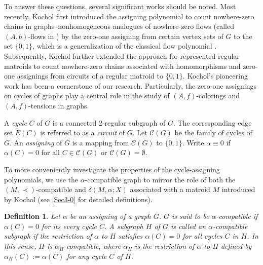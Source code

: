 \documentclass[12pt]{article}%
\numberwithin{equation}{section}
\newtheorem{definition}[definition]{Definition}
\begin{document}
To answer these questions, several significant works should be noted. Most recently, Kochol \cite{Kochol2022} first introduced the assigning polynomial to count nowhere-zero chains in graphs--nonhomogeneous analogues of nowhere-zero flows (called $(A,b)$-flows in \cite{Lai2006}) by the zero-one assigning from certain vertex sets of $G$ to the set $\{0,1\}$, which is a generalization of the classical flow polynomial \cite{Tutte1954}. Subsequently, Kochol \cite{Kochol2024} further extended the approach for represented regular matroids to count nowhere-zero chains associated with homomorphisms and zero-one assignings from circuits of a regular matroid to $\{0,1\}$. Kochol's pioneering work has been a cornerstone of our research. Particularly, the zero-one assignings on cycles of graphs play a central  role in the study of $(A,f)$-colorings and $(A,f)$-tensions in graphs. 

A {\em cycle } $C$ of $G$ is a connected 2-regular subgraph of $G$. The corresponding edge set $E(C)$ is referred to as a {\em circuit} of $G$. Let $\mathcal{C}(G)$ be the family of cycles of $G$. An {\em assigning} of $G$ is a mapping from $\mathcal{C}(G)$ to $\{0,1\}$. Write $\alpha\equiv0$ if $\alpha(C)=0$ for all $C\in\mathcal{C}(G)$ or $\mathcal{C}(G)=\emptyset$. 

To more conveniently investigate the properties of the cycle-assigning polynomials, we use the $\alpha$-compatible graph to mirror the role of both the $(M,\prec)$-compatible and $\delta(M,\alpha;X)$ associated with a matroid $M$ introduced by Kochol \cite{Kochol2024} (see \autoref{Sec3-0} for detailed definitions).
\begin{definition}
{\rm
Let $\alpha$ be an assigning of a graph $G$. $G$ is said to be {\em $\alpha$-compatible} if $\alpha(C)=0$ for its every cycle $C$. A subgraph $H$ of $G$ is called an {\em $\alpha$-compatible subgraph} if the restriction of $\alpha$ to $H$  satisfies $\alpha(C)=0$ for all cycles $C$ in $H$. In this sense, $H$ is $\alpha_H$-compatible, where $\alpha_H$ is the restriction of $\alpha$ to $H$ defined by $\alpha_H(C):=\alpha(C)$ for any cycle $C$ of $H$.}
\end{definition}
\end{document}
